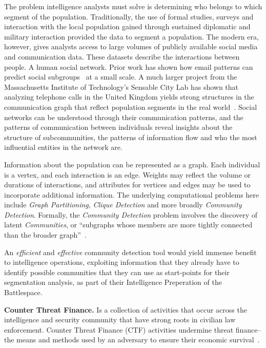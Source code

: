 The problem intelligence analysts must solve is determining who belongs to which segment of the population.
Traditionally, the use of formal studies, surveys and interaction with the local population gained through sustained diplomatic and military interaction provided the data to segment a population.
The modern era, however, gives analysts access to large volumes of publicly available social media and communication data.
These datasets describe the interactions between people. 
A human social network. 
Prior work has shown how email patterns can predict social subgroups~\cite{Zachary1977} at a small scale.
A much larger project from the Massachusetts Institute of Technology's Sensable City Lab has shown that analyzing telephone calls in the United Kingdom yields strong structures in the communication graph that reflect population segments in the real world~\cite{Sobolevsky2014}.
Social networks can be understood through their communication patterns, and the patterns of communication between individuals reveal insights about the structure of subcommunities, the patterns of information flow and who the most influential entities in the network are.

Information about the population can be represented as a graph. 
Each individual is a vertex, and each interaction is an edge. 
Weights may reflect the volume or durations of interactions, and attributes for vertices and edges may be used to incorporate additional information.
The underlying computational problems here include \textit{Graph Partitioning}, \textit{Clique Detection} and more broadly \textit{Community Detection}.
Formally, the \textit{Community Detection} problem involves the discovery of latent \textit{Communities}, or ``subgraphs whose members are more tightly connected than the broader graph''~\cite{Fortunato2007}. 

An \textit{efficient} and \textit{effective} community detection tool would yield immense benefit to intelligence operations, exploiting information that they already have to identify possible communities that they can use as start-points for their segmentation analysis, as part of their Intelligence Preperation of the Battlespace. 

\textbf{Counter Threat Finance.}
Is a collection of activities that occur across the intelligence and security community that have strong roots in civilian law enforcement. 
Counter Threat Finance (CTF) activities undermine threat finance--the means and methods used by an adversary to ensure their economic survival~\cite{Keene2014}. 

